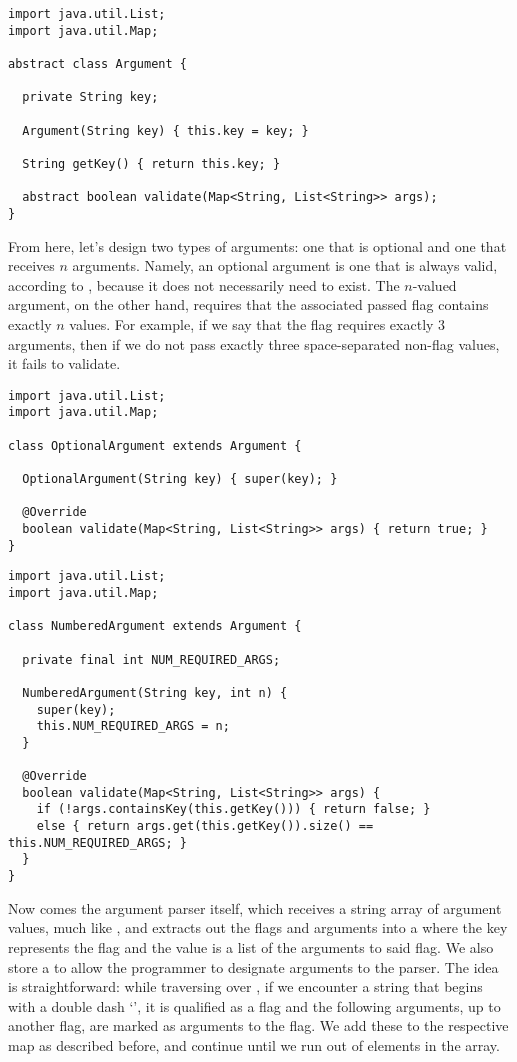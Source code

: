 \begin{lstlisting}[language=MyJava]
import java.util.List;
import java.util.Map;

abstract class Argument {

  private String key;

  Argument(String key) { this.key = key; }

  String getKey() { return this.key; }

  abstract boolean validate(Map<String, List<String>> args);
}
\end{lstlisting}

From here, let's design two types of arguments: one that is optional and one that receives $n$ arguments. Namely, an optional argument is one that is always valid, according to , because it does not necessarily need to exist. The $n$-valued argument, on the other hand, requires that the associated passed flag contains exactly $n$ values. For example, if we say that the  flag requires exactly $3$ arguments, then if we do not pass exactly three space-separated non-flag values, it fails to validate.

\begin{lstlisting}[language=MyJava]
import java.util.List;
import java.util.Map;

class OptionalArgument extends Argument {

  OptionalArgument(String key) { super(key); }

  @Override
  boolean validate(Map<String, List<String>> args) { return true; }
}
\end{lstlisting}

\begin{lstlisting}[language=MyJava]
import java.util.List;
import java.util.Map;

class NumberedArgument extends Argument {

  private final int NUM_REQUIRED_ARGS;

  NumberedArgument(String key, int n) {
    super(key);
    this.NUM_REQUIRED_ARGS = n;
  }

  @Override
  boolean validate(Map<String, List<String>> args) {
    if (!args.containsKey(this.getKey())) { return false; } 
    else { return args.get(this.getKey()).size() == this.NUM_REQUIRED_ARGS; }
  }
}
\end{lstlisting}

Now comes the argument parser itself, which receives a string array of argument values, much like , and extracts out the flags and arguments into a  where the key represents the flag and the value is a list of the arguments to said flag. We also store a  to allow the programmer to designate arguments to the parser. The idea is straightforward: while traversing over , if we encounter a string that begins with a double dash `\ttt{--}', it is qualified as a flag and the following arguments, up to another flag, are marked as arguments to the flag. We add these to the respective map as described before, and continue until we run out of elements in the array.

